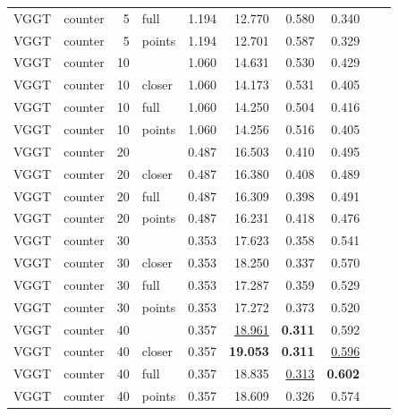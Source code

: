 \begin{table}[H]
\begin{tabular}{llrlrrrrll}
VGGT & counter & 5 & full & 1.194 & 12.770 & 0.580 & 0.340 &  &  \\
VGGT & counter & 5 & points & 1.194 & 12.701 & 0.587 & 0.329 &  &  \\
VGGT & counter & 10 &  & 1.060 & 14.631 & 0.530 & 0.429 &  &  \\
VGGT & counter & 10 & closer & 1.060 & 14.173 & 0.531 & 0.405 &  &  \\
VGGT & counter & 10 & full & 1.060 & 14.250 & 0.504 & 0.416 &  &  \\
VGGT & counter & 10 & points & 1.060 & 14.256 & 0.516 & 0.405 &  &  \\
VGGT & counter & 20 &  & 0.487 & 16.503 & 0.410 & 0.495 &  &  \\
VGGT & counter & 20 & closer & 0.487 & 16.380 & 0.408 & 0.489 &  &  \\
VGGT & counter & 20 & full & 0.487 & 16.309 & 0.398 & 0.491 &  &  \\
VGGT & counter & 20 & points & 0.487 & 16.231 & 0.418 & 0.476 &  &  \\
VGGT & counter & 30 &  & 0.353 & 17.623 & 0.358 & 0.541 &  &  \\
VGGT & counter & 30 & closer & 0.353 & 18.250 & 0.337 & 0.570 &  &  \\
VGGT & counter & 30 & full & 0.353 & 17.287 & 0.359 & 0.529 &  &  \\
VGGT & counter & 30 & points & 0.353 & 17.272 & 0.373 & 0.520 &  &  \\
VGGT & counter & 40 &  & 0.357 & \underline{18.961} & \textbf{0.311} & 0.592 &  &  \\
VGGT & counter & 40 & closer & 0.357 & \textbf{19.053} & \textbf{0.311} & \underline{0.596} &  &  \\
VGGT & counter & 40 & full & 0.357 & 18.835 & \underline{0.313} & \textbf{0.602} &  &  \\
VGGT & counter & 40 & points & 0.357 & 18.609 & 0.326 & 0.574 &  &  \\
\bottomrule
\end{tabular}
\end{table}